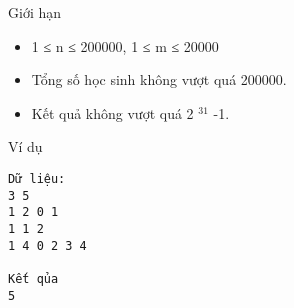 Giới hạn
\begin{itemize}
	\item     1 ≤ n ≤ 200000, 1 ≤ m ≤ 20000   
	\item     Tổng số học sinh không vượt quá 200000.   
	\item     Kết quả không vượt quá 2    $^     31    $    -1.   
\end{itemize}
Ví dụ
\begin{verbatim}
Dữ liệu:
3 5
1 2 0 1
1 1 2
1 4 0 2 3 4

Kết qủa
5
\end{verbatim}